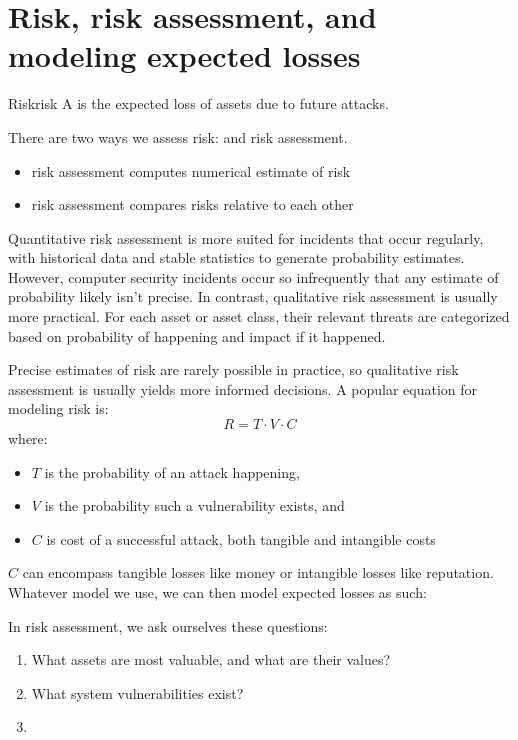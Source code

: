 \documentclass[12pt]{report}
\begin{document}
\section{Risk, risk assessment, and modeling expected losses}

\begin{dfnbox}{Risk}{risk}
    A  is the expected loss of assets due to future attacks.
\end{dfnbox}

There are two ways we assess risk:  and  risk assessment.
\begin{itemize}
    \item {} risk assessment computes numerical estimate of risk
    \item {} risk assessment compares risks relative to each other
\end{itemize}

Quantitative risk assessment is more suited for incidents that occur regularly, with historical data and stable statistics to generate probability estimates. However, computer security incidents occur so infrequently that any estimate of probability likely isn't precise. In contrast, qualitative risk assessment is usually more practical. For each asset or asset class, their relevant threats are categorized based on probability of happening and impact if it happened.

Precise estimates of risk are rarely possible in practice, so qualitative risk assessment is usually yields more informed decisions. A popular equation for modeling risk is:
\[ R = T \cdot V \cdot C \]
where:
\begin{itemize}
    \item $T$ is the probability of an attack happening,
    \item $V$ is the probability such a vulnerability exists, and
    \item $C$ is cost of a successful attack, both tangible and intangible costs
\end{itemize}

$C$ can encompass tangible losses like money or intangible losses like reputation. Whatever model we use, we can then model expected losses as such:

In risk assessment, we ask ourselves these questions:
\begin{enumerate}
    \item What assets are most valuable, and what are their values?
    \item What system vulnerabilities exist?
    \item
\end{enumerate}
\end{document}
